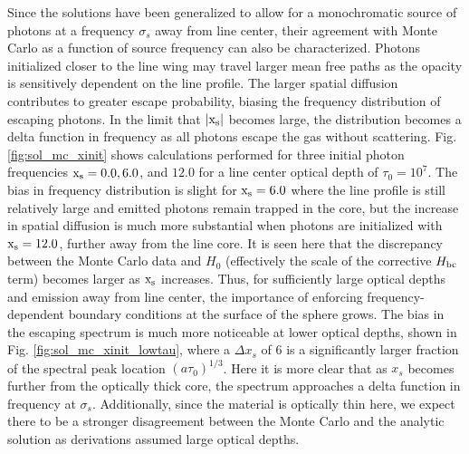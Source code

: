 \documentclass{aastex63}
\begin{document}
Since the solutions have been generalized to allow for a monochromatic source of photons at a frequency $\sigma_s$ away from line center, their agreement with Monte Carlo as a function of source frequency can also be characterized. Photons initialized closer to the line wing may travel larger mean free paths as the opacity is sensitively dependent on the line profile. The larger spatial diffusion contributes to greater escape probability, biasing the frequency distribution of escaping photons. In the limit that $|\rm x_s|$ becomes large, the distribution becomes a delta function in frequency as all photons escape the gas without scattering. Fig. \ref{fig:sol_mc_xinit} shows calculations performed for three initial photon frequencies $\rm x_s = 0.0, 6.0$, and $12.0$ for a line center optical depth of $\tau_0=10^7$. The bias in frequency distribution is slight for $\rm x_s = 6.0$ where the line profile is still relatively large and emitted photons remain trapped in the core, but the increase in spatial diffusion is much more substantial when photons are initialized with $\rm x_s=12.0$, further away from the line core. It is seen here that the discrepancy between the Monte Carlo data and $H_0$ (effectively the scale of the corrective $H_{\rm bc}$ term) becomes larger as $\rm x_s$ increases. Thus, for sufficiently large optical depths and emission away from line center, the importance of enforcing frequency-dependent boundary conditions at the surface of the sphere grows. The bias in the escaping spectrum is much more noticeable at lower optical depths, shown in Fig. \ref{fig:sol_mc_xinit_lowtau}, where a $\Delta x_s$ of 6 is a significantly larger fraction of the spectral peak location $(a\tau_0)^{1/3}$. Here it is more clear that as $x_s$ becomes further from the optically thick core, the spectrum approaches a delta function in frequency at $\sigma_s$. Additionally, since the material is optically thin here, we expect there to be a stronger disagreement between the Monte Carlo and the analytic solution as derivations assumed large optical depths.
\end{document}
